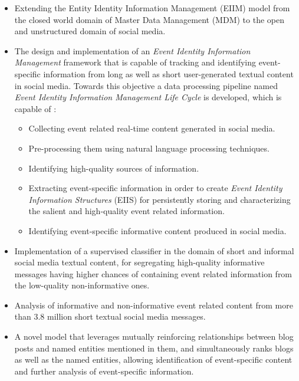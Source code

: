 \begin{itemize}
\item Extending the Entity Identity Information Management (EIIM) model  \cite{zhou2011entity} from the closed world domain of Master Data Management (MDM) to the open and unstructured domain of social media.

\item The design and implementation of an \textit{Event Identity Information Management} framework that is capable of tracking and identifying event-specific information from long as well as short user-generated textual content in social media. Towards this objective a data processing pipeline named \textit{Event Identity Information Management Life Cycle} is developed, which is capable of :
\begin{itemize}
\item Collecting event related real-time content generated in social media.
\item Pre-processing them using natural language processing techniques.
\item Identifying high-quality sources of information.
\item Extracting event-specific information in order to create \textit{Event Identity Information Structures} (EIIS) for persistently storing and characterizing the salient and high-quality event related information. 
\item Identifying event-specific informative content produced in social media.
\end{itemize}


\item Implementation of a supervised classifier in the domain of short and informal social media textual content, for segregating high-quality informative messages having higher chances of containing event related information from the low-quality non-informative ones. 

\item Analysis of informative and non-informative event related content from more than 3.8 million short textual social media messages.

\item A novel model that leverages mutually reinforcing relationships between blog posts and named entities mentioned in them, and simultaneously ranks blogs as well as the named entities, allowing identification of event-specific content and further analysis of event-specific information.


\end{itemize}
